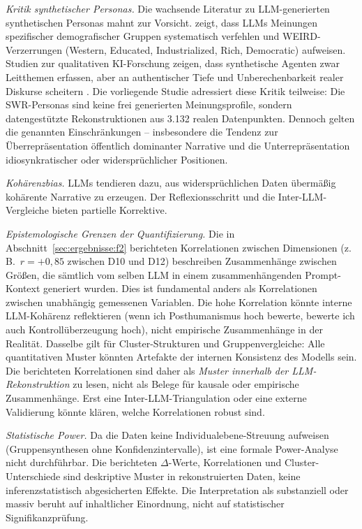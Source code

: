 \documentclass[12pt,a4paper]{article}
\begin{document}
\emph{Kritik synthetischer Personas.} Die wachsende Literatur zu LLM-generierten synthetischen Personas mahnt zur Vorsicht. \citet{Santurkar2023} zeigt, dass LLMs Meinungen spezifischer demografischer Gruppen systematisch verfehlen und \glqq WEIRD\grqq-Verzerrungen (Western, Educated, Industrialized, Rich, Democratic) aufweisen. Studien zur qualitativen KI-Forschung zeigen, dass synthetische Agenten zwar Leitthemen erfassen, aber an authentischer Tiefe und Unberechenbarkeit realer Diskurse scheitern \citep{Argyle2023}. Die vorliegende Studie adressiert diese Kritik teilweise: Die SWR-Personas sind keine frei generierten Meinungsprofile, sondern datengest\"utzte Rekonstruktionen aus 3.132 realen Datenpunkten. Dennoch gelten die genannten Einschr\"ankungen -- insbesondere die Tendenz zur \"Uberrepr\"asentation \"offentlich dominanter Narrative und die Unterrepr\"asentation idiosynkratischer oder widerspr\"uchlicher Positionen.

\emph{Koh\"arenzbias.} LLMs tendieren dazu, aus widerspr\"uchlichen Daten \"uberm\"a\ss{}ig koh\"arente Narrative zu erzeugen. Der Reflexionsschritt und die Inter-LLM-Vergleiche bieten partielle Korrektive.

\emph{Epistemologische Grenzen der Quantifizierung.} Die in Abschnitt~\ref{sec:ergebnisse:f2} berichteten Korrelationen zwischen Dimensionen (z.\,B.\ $r = +0{,}85$ zwischen D10 und D12) beschreiben Zusammenh\"ange zwischen Gr\"o\ss{}en, die s\"amtlich vom selben LLM in einem zusammenh\"angenden Prompt-Kontext generiert wurden. Dies ist fundamental anders als Korrelationen zwischen unabh\"angig gemessenen Variablen. Die hohe Korrelation k\"onnte interne LLM-Koh\"arenz reflektieren (\glqq wenn ich Posthumanismus hoch bewerte, bewerte ich auch Kontroll\"uberzeugung hoch\grqq), nicht empirische Zusammenh\"ange in der Realit\"at. Dasselbe gilt f\"ur Cluster-Strukturen und Gruppenvergleiche: Alle quantitativen Muster k\"onnten Artefakte der internen Konsistenz des Modells sein. Die berichteten Korrelationen sind daher als \emph{Muster innerhalb der LLM-Rekonstruktion} zu lesen, nicht als Belege f\"ur kausale oder empirische Zusammenh\"ange. Erst eine Inter-LLM-Triangulation oder eine externe Validierung k\"onnte kl\"aren, welche Korrelationen robust sind.

\emph{Statistische Power.} Da die Daten keine Individualebene-Streuung aufweisen (Gruppensynthesen ohne Konfidenzintervalle), ist eine formale Power-Analyse nicht durchf\"uhrbar. Die berichteten $\Delta$-Werte, Korrelationen und Cluster-Unterschiede sind deskriptive Muster in rekonstruierten Daten, keine inferenzstatistisch abgesicherten Effekte. Die Interpretation als \glqq substanziell\grqq{} oder \glqq massiv\grqq{} beruht auf inhaltlicher Einordnung, nicht auf statistischer Signifikanzpr\"ufung.
\end{document}
